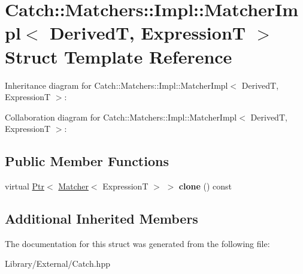 \hypertarget{struct_catch_1_1_matchers_1_1_impl_1_1_matcher_impl}{}\section{Catch\+:\+:Matchers\+:\+:Impl\+:\+:Matcher\+Impl$<$ Derived\+T, Expression\+T $>$ Struct Template Reference}
\label{struct_catch_1_1_matchers_1_1_impl_1_1_matcher_impl}


Inheritance diagram for Catch\+:\+:Matchers\+:\+:Impl\+:\+:Matcher\+Impl$<$ Derived\+T, Expression\+T $>$\+:


Collaboration diagram for Catch\+:\+:Matchers\+:\+:Impl\+:\+:Matcher\+Impl$<$ Derived\+T, Expression\+T $>$\+:
\subsection*{Public Member Functions}
\begin{DoxyCompactItemize}
\item 
\hypertarget{struct_catch_1_1_matchers_1_1_impl_1_1_matcher_impl_afe2e10779f91394f80ff5c894fb1bfab}{}virtual \hyperlink{class_catch_1_1_ptr}{Ptr}$<$ \hyperlink{struct_catch_1_1_matchers_1_1_impl_1_1_matcher}{Matcher}$<$ Expression\+T $>$ $>$ {\bfseries clone} () const \label{struct_catch_1_1_matchers_1_1_impl_1_1_matcher_impl_afe2e10779f91394f80ff5c894fb1bfab}

\end{DoxyCompactItemize}
\subsection*{Additional Inherited Members}


The documentation for this struct was generated from the following file\+:\begin{DoxyCompactItemize}
\item 
Library/\+External/Catch.\+hpp\end{DoxyCompactItemize}
